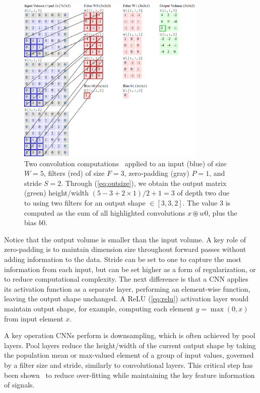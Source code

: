 \begin{figure}[ht!]
	\centering	\includegraphics[width=0.8\textwidth,keepaspectratio]{figs/filter.eps}
    \caption{Two convolution computations~\cite{cs231} applied to an input (blue) of size $W=5$, filters (red) of size $F=3$, zero-padding (gray) $P=1$, and stride $S=2$. Through (\ref{eq:outsize}), we obtain the output matrix (green) height/width $(5-3+2\times 1)/2+1=3$ of depth two due to using two filters for an output shape $\in [3,3,2]$. The value $3$ is computed as the sum of all highlighted convolutions $x\circledast w0$, plus the bias $b0$.}
\label{fig:filter}      
\end{figure}

Notice that the output volume is smaller than the input volume. A key role of zero-padding is to maintain dimension size throughout forward passes without adding information to the data. Stride can be set to one to capture the most information from each input, but can be set higher as a form of regularization, or to reduce computational complexity. The next difference is that a CNN applies its activation function as a separate layer, performing an element-wise function, leaving the output shape unchanged. A ReLU (\ref{eq:relu}) activation layer would maintain output shape, for example, computing each element $y=\max(0,x)$ from input element $x$.

A key operation CNNs perform is downsampling, which is often achieved by pool layers. Pool layers reduce the height/width of the current output shape by taking the population mean or max-valued element of a group of input values, governed by a filter size and stride, similarly to convolutional layers. This critical step has been shown~\cite{cs231} to reduce over-fitting while maintaining the key feature information of signals.

